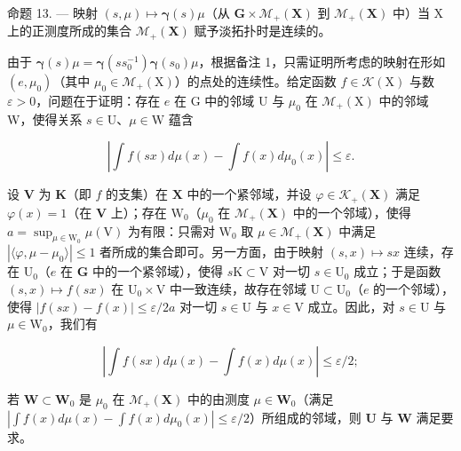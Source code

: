 命题 13. --- 映射 \((s,\mu)\mapsto\boldsymbol{\gamma}(s)\mu\)（从 \(\mathbf{G}\times\mathcal{M}_{+}(\mathbf{X})\) 到 \(\mathcal{M}_{+}(\mathbf{X})\) 中）当 X 上的正测度所成的集合 \(\mathcal{M}_{+}(\mathbf{X})\) 赋予淡拓扑时是连续的。

由于 \(\pmb{\gamma}(s)\mu = \pmb{\gamma}(ss_0^{-1})\pmb{\gamma}(s_0)\mu\)，根据备注 1，只需证明所考虑的映射在形如 \((e,\mu_0)\)（其中 \(\mu_0\in \mathcal{M}_+(\mathrm{X})\)）的点处的连续性。给定函数 \(f\in \mathcal{K}(\mathrm{X})\) 与数 \(\varepsilon >0\)，问题在于证明：存在 \(e\) 在 G 中的邻域 U 与 \(\mu_0\) 在 \(\mathcal{M}_+(\mathrm{X})\) 中的邻域 W，使得关系 \(s\in \mathrm{U}\)、\(\mu \in \mathrm{W}\) 蕴含

\[
\left| \int f (s x) d \mu (x) - \int f (x) d \mu_ {0} (x) \right| \leqslant \varepsilon .\tag{6}
\]

设 \(\mathbf{V}\) 为 \(\mathbf{K}\)（即 \(f\) 的支集）在 \(\mathbf{X}\) 中的一个紧邻域，并设 \(\varphi \in \mathcal{K}_{+}(\mathbf{X})\) 满足 \(\varphi(x) = 1\)（在 \(\mathbf{V}\) 上）；存在 \(\mathrm{W}_0\)（\(\mu_0\) 在 \(\mathcal{M}_{+}(\mathbf{X})\) 中的一个邻域），使得 \(a = \sup_{\mu \in \mathrm{W}_0} \mu(\mathrm{V})\) 为有限：只需对 \(\mathrm{W}_0\) 取 \(\mu \in \mathcal{M}_{+}(\mathbf{X})\) 中满足 \(|\langle \varphi, \mu - \mu_0 \rangle| \leqslant 1\) 者所成的集合即可。另一方面，由于映射 \((s, x) \mapsto sx\) 连续，存在 \(\mathrm{U}_0\)（\(e\) 在 \(\mathbf{G}\) 中的一个紧邻域），使得 \(s\mathrm{K} \subset \mathrm{V}\) 对一切 \(s \in \mathrm{U}_0\) 成立；于是函数 \((s, x) \mapsto f(sx)\) 在 \(\mathrm{U}_0 \times \mathrm{V}\) 中一致连续，故存在邻域 \(\mathrm{U} \subset \mathrm{U}_0\)（\(e\) 的一个邻域），使得 \(|f(sx) - f(x)| \leqslant \varepsilon / 2a\) 对一切 \(s \in \mathrm{U}\) 与 \(x \in \mathrm{V}\) 成立。因此，对 \(s \in \mathrm{U}\) 与 \(\mu \in \mathrm{W}_0\)，我们有

\[
\left| \int f (s x) d \mu (x) - \int f (x) d \mu (x) \right| \leqslant \varepsilon / 2;
\]

若 \(\mathbf{W} \subset \mathbf{W}_0\) 是 \(\mu_0\) 在 \(\mathcal{M}_{+}(\mathbf{X})\) 中的由测度 \(\mu \in \mathbf{W}_0\)（满足 \(|\int f(x) d\mu(x) - \int f(x) d\mu_0(x)| \leqslant \varepsilon/2\)）所组成的邻域，则 \(\mathbf{U}\) 与 \(\mathbf{W}\) 满足要求。


